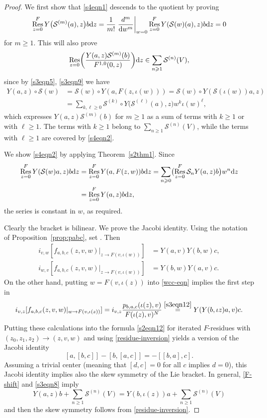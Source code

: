 \documentclass[10pt,a4paper]{amsart}
\numberwithin{equation}{section}
\theoremstyle{definition}
\DeclareMathOperator\Res{Res}
\begin{document}
\begin{proof}
We first show that \eqref{s4eqn1} descends to the quotient by proving
\begin{equation}
\label{s4eqn2}
\Res^F_{z=0} Y\bigl(\mathcal{S}^{(m)}(a),z\bigr)b {\rm d}z=\frac{1}{m!}\left.\frac{d^m}{{\rm d}w^m}\right|_{w=0} \Res_{z=0}^F Y(\mathcal{S}(w)(a),z)b {\rm d}z
=0
\end{equation}
for $m\geqslant1$. This will also prove
\[
 \Res_{z=0}\biggl(\frac{Y(a,z)\mathcal{S}^{(m)}(b)}{F^{1,0}(0,z)}\biggr){\rm d}z\in\sum_{n\geqslant1}\mathcal{S}^{(n)}(V),
\]
since by \eqref{s3eqn5}, \eqref{s3eqn9} we have
\begin{align*}
Y(a,z)\circ\mathcal{S}(w)&=\mathcal{S}(w)\circ Y(a,F(z,\iota(w)))=\mathcal{S}(w)\circ Y(\mathcal{S}(\iota(w))a,z)\\
&=\sum_{k,\ell\geqslant0} \mathcal{S}^{(k)}\circ Y\big(\mathcal{S}^{(\ell)}(a),z\big)w^k\iota(w)^\ell,
\end{align*}
which expresses $Y(a,z)\mathcal{S}^{(m)}(b)$ for $m\geqslant 1$ as a sum of terms with $k\geqslant1$ or with $\ell\geqslant1$. The terms with $k\geqslant1$ belong to $\sum_{n\geqslant1}\mathcal{S}^{(n)}(V)$, while the terms with $\ell\geqslant1$ are covered by \eqref{s4eqn2}.

We show \eqref{s4eqn2} by applying Theorem~\ref{s2thm1}. Since
\begin{align*}
 \Res_{z=0}^F Y(\mathcal{S}(w)a,z)b {\rm d}z&=\Res_{z=0}^F Y(a,F(z,w))b {\rm d}z=\sum_{n\geqslant0}\bigl(\Res_{z=0}^F\mathcal{S}_n Y(a,z)b\bigr) w^n {\rm d}z\\
 &=\Res_{z=0}^F Y(a,z)b {\rm d}z,
\end{align*}
the series is constant in $w$, as required.

Clearly the bracket is bilinear. We prove the Jacobi identity. Using the notation of Proposition~\ref{prop:pabc}, set . Then
\begin{align*}
 i_{v,w}[f_{a,b,c}(z,v,w)|_{z\to F(v,\iota(w))}]&=Y(a,v)Y(b,w)c,\\
 i_{w,v}[f_{a,b,c}(z,v,w)|_{z\to F(v,\iota(w))}]&=Y(b,w)Y(a,v)c.
\end{align*}
On the other hand, putting $w=F(v,\iota(z))$ into \eqref{wcc-eqn} implies the first step in
\[
 i_{v,z}[f_{a,b,c}(z,v,w)|_{w\to F(v,\iota(z))}]=i_{v,z}\frac{p_{b,a,c}(\iota(z),v)}{F(\iota(z),v)^N}
 \overset{\eqref{s3eqn12}}{=} Y(Y(b,\iota z)a,v)c.
\]
Putting these calculations into the formula \eqref{s2eqn12} for iterated $F$-residues with $(z_0,z_1,z_2)\to(z,v,w)$ and using \eqref{residue-inversion} yields a version of the Jacobi identity
\[
 [a,[b,c]]-[b,[a,c]]=-[[b,a],c].
\]
Assuming a trivial center (meaning that $[d,c]=0$ for all $c$ implies $d=0$), this Jacobi identity implies also the skew symmetry of the Lie bracket. In general, \eqref{F-shift} and \eqref{s3eqn8} imply
\[
 Y(a,z)b + \sum_{n\geqslant1}\mathcal{S}^{(n)}(V) = Y(b,\iota(z))a + \sum_{n\geqslant1}\mathcal{S}^{(n)}(V)
\]
and then the skew symmetry follows from \eqref{residue-inversion}.
\end{proof}
\end{document}
